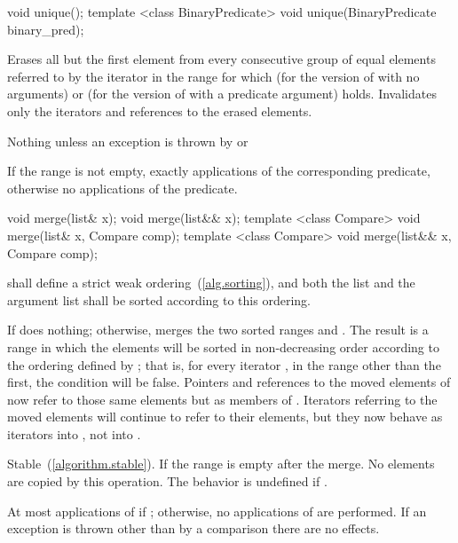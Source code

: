 %
\begin{itemdecl}
void unique();
template <class BinaryPredicate> void unique(BinaryPredicate binary_pred);
\end{itemdecl}

\begin{itemdescr}
\pnum
\effects
Erases all but the first element from every
consecutive group of equal elements referred to by the iterator  in the range
 for which  (for the version of
 with no arguments) or  (for the version of
 with a predicate argument) holds.
Invalidates only the iterators and references to the erased elements.

\pnum
\throws
Nothing unless an exception is thrown by
or

\pnum
\complexity
If the range
\tcode{[first, last)}
is not empty, exactly
applications of the corresponding predicate,
otherwise no applications of the predicate.
\end{itemdescr}

%
\begin{itemdecl}
void merge(list& x);
void merge(list&& x);
template <class Compare> void merge(list& x, Compare comp);
template <class Compare> void merge(list&& x, Compare comp);
\end{itemdecl}

\begin{itemdescr}
\pnum
\requires
{} shall define a strict weak ordering~(\ref{alg.sorting}), and both the list and the argument list shall be
sorted according to this ordering.

\pnum
\effects
If  does nothing; otherwise, merges the two sorted ranges \tcode{[begin(),
end())} and \tcode{[x.\brk{}begin(), x.end())}. The result is a range in which the elements
will be sorted in non-decreasing order according to the ordering defined by ; that
is, for every iterator , in the range other than the first, the condition
 will be false.
Pointers and references to the moved elements of  now refer to those same elements
but as members of . Iterators referring to the moved elements will continue to
refer to their elements, but they now behave as iterators into , not into
.

\pnum
\remarks Stable~(\ref{algorithm.stable}). If  the range \tcode{[x.begin(), x.end())}
is empty after the merge.
No elements are copied by this operation. The behavior is undefined if
.

\pnum
\complexity
At most
applications of  if
;
otherwise, no applications of  are performed.
If an exception is thrown other than by a comparison there are no effects.
\end{itemdescr}

